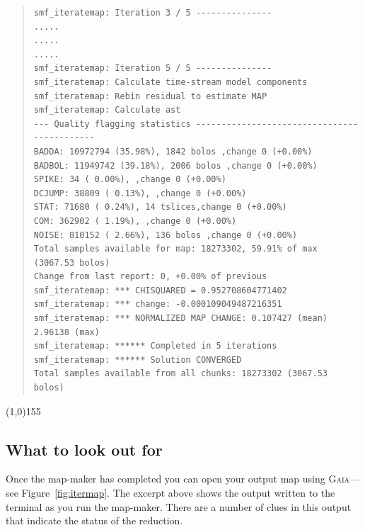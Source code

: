\documentclass[twoside,11pt]{article}
\newcommand{\htmlref}[2]{#1}
\newcommand{\latex}[1]{#1}
\newcommand{\latexhtml}[2]{#1}
\newcommand{\xref}[3]{#1}
\newcommand{\xlabel}[1]{}
\renewcommand{\_}{\texttt{\symbol{95}}}
\newenvironment{myquote}{\begin{quote}\begin{small}}{\end{small}\end{quote}}
\newcommand{\gaia}{\xref{\textsc{Gaia}}{sun214}{}}
\newcommand{\cref}[3]{\latexhtml{#1~\ref{#2}}{\htmlref{#3}{#2}}}
\begin{document}
\begin{myquote}
\begin{verbatim}
smf_iteratemap: Iteration 3 / 5 ---------------
.....
.....
.....
smf_iteratemap: Iteration 5 / 5 ---------------
smf_iteratemap: Calculate time-stream model components
smf_iteratemap: Rebin residual to estimate MAP
smf_iteratemap: Calculate ast
--- Quality flagging statistics --------------------------------------------
BADDA: 10972794 (35.98%), 1842 bolos ,change 0 (+0.00%)
BADBOL: 11949742 (39.18%), 2006 bolos ,change 0 (+0.00%)
SPIKE: 34 ( 0.00%), ,change 0 (+0.00%)
DCJUMP: 38809 ( 0.13%), ,change 0 (+0.00%)
STAT: 71680 ( 0.24%), 14 tslices,change 0 (+0.00%)
COM: 362902 ( 1.19%), ,change 0 (+0.00%)
NOISE: 810152 ( 2.66%), 136 bolos ,change 0 (+0.00%)
Total samples available for map: 18273302, 59.91% of max (3067.53 bolos)
Change from last report: 0, +0.00% of previous
smf_iteratemap: *** CHISQUARED = 0.952708604771402
smf_iteratemap: *** change: -0.000109049487216351
smf_iteratemap: *** NORMALIZED MAP CHANGE: 0.107427 (mean) 2.96138 (max)
smf_iteratemap: ****** Completed in 5 iterations
smf_iteratemap: ****** Solution CONVERGED
Total samples available from all chunks: 18273302 (3067.53 bolos)
\end{verbatim}
\end{myquote}
\vspace{-10mm}
\begin{center}
\latex{\line(1,0){155}}
\end{center}

\subsection{\xlabel{look_for}What to look out for}

Once the map-maker has completed you can open your output map using
\gaia---see \cref{Figure}{fig:itermap}{the figure below}. The excerpt
above shows the output written to the terminal as you run the map-maker. There
are a number of clues in this output that indicate the status of the
reduction.
\end{document}
